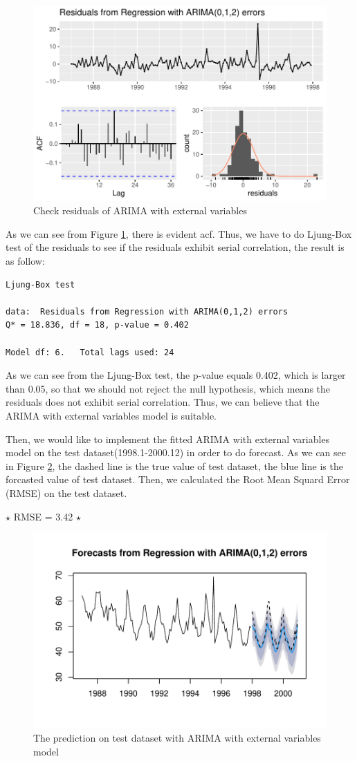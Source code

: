 \documentclass{article}
\begin{document}
\begin{figure}[H]
    \centering
    \includegraphics[width=0.65\linewidth]{images/arima-best-acf}
    \caption{Check residuals of ARIMA with external variables}
    \label{arima-best-acf}
\end{figure}
As we can see from Figure \ref{arima-best-acf},  
there is evident acf. Thus, we have to do Ljung-Box test of the residuals to see if the residuals exhibit serial correlation, the result is as follow:

\begin{lstlisting}
Ljung-Box test

data:  Residuals from Regression with ARIMA(0,1,2) errors
Q* = 18.836, df = 18, p-value = 0.402

Model df: 6.   Total lags used: 24
\end{lstlisting}
As we can see from the Ljung-Box test, the p-value equals 0.402, which is larger than 0.05, so that we should not reject the null hypothesis, which means 
the residuals does not exhibit serial correlation. Thus, we can believe that the ARIMA with external variables model is suitable.

\vspace{4pt}
Then, we would like to implement the fitted ARIMA with external variables model on the test dataset(1998.1-2000.12) in order to do forecast. As we can see in Figure \ref{arima-best-test}, the dashed line is the true 
value of test dataset, the blue line is the forcasted value of test dataset. Then, we calculated the Root Mean Squard Error (RMSE) on the test dataset. 

$\star$ RMSE = 3.42 $\star$
\begin{figure}[H]
    \centering
    \includegraphics[width=0.65\linewidth]{images/arima-best-test}
    \caption{The prediction on test dataset with ARIMA with external variables model}
    \label{arima-best-test}
\end{figure}
\end{document}
